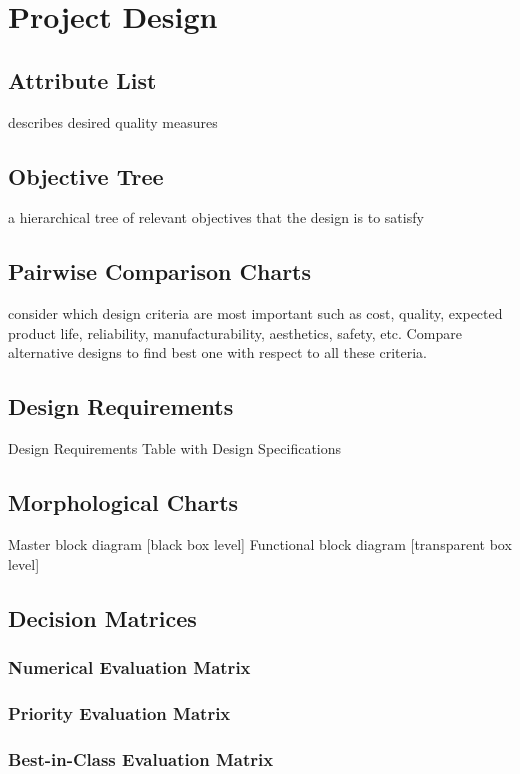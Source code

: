 \chapter{Project Design}
\section{Attribute List}
describes desired quality measures
\section{Objective Tree}
a hierarchical tree of relevant objectives that the design is to satisfy
\section{Pairwise Comparison Charts}
consider which design criteria are most important such as cost,
quality, expected product life, reliability, manufacturability, aesthetics, safety, etc. Compare alternative designs to find best one with respect to all these criteria.
\section{Design Requirements}
Design Requirements Table with Design Specifications
\section{Morphological Charts}
Master block diagram [black box level]
Functional block diagram [transparent box level]
\section{Decision Matrices}
\subsection{Numerical Evaluation Matrix}
\subsection{Priority Evaluation Matrix}
\subsection{Best-in-Class Evaluation Matrix}

